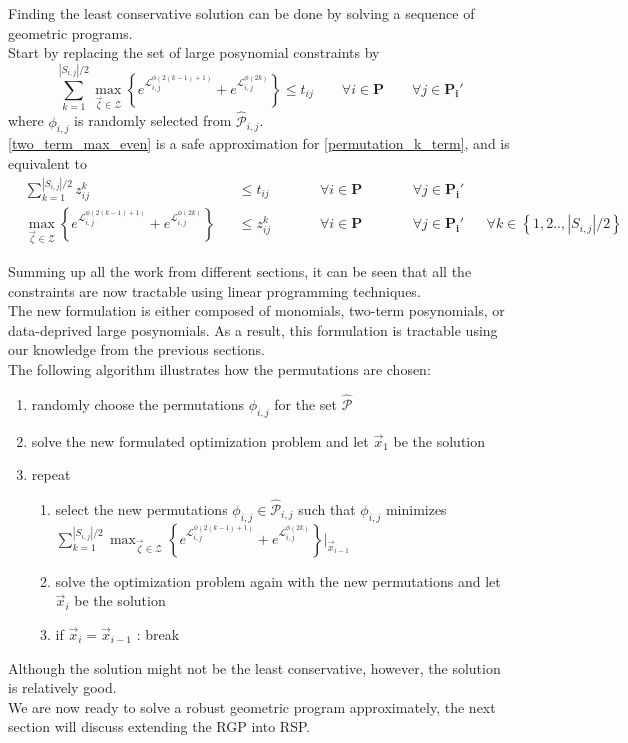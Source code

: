 Finding the least conservative solution can be done by solving a sequence of geometric programs.\\
Start by replacing the set of large posynomial constraints by
\begin{equation}
\textstyle{\sum}_{k=1}^{|S_{i,j}|/2} \max_{\vec{\zeta} \in \mathcal{Z}} \left\{e^{\mathcal{L}^{\phi(2(k-1)+1)}_{i,j}} + e^{\mathcal{L}^{\phi(2k)}_{i,j}}\right\}\leq t_{ij} \qquad \forall i \in \mathbf{P} \qquad \forall j \in \mathbf{P_i'}
\label{two_term_max_even}
\end{equation}
where $\phi_{i,j}$ is randomly selected from $\hat{\mathcal{P}}_{i,j}$.\\
\eqref{two_term_max_even} is a safe approximation for \eqref{permutation_k_term}, and is equivalent to
\begin{equation}
\begin{aligned}
&\textstyle{\sum}_{k=1}^{|S_{i,j}|/2} z_{ij}^k &&\leq t_{ij} \qquad &&\forall i \in \mathbf{P} \qquad &&\forall j \in \mathbf{P_i'}\\
&\max_{\vec{\zeta} \in \mathcal{Z}} \left\{e^{\mathcal{L}^{\phi(2(k-1)+1)}_{i,j}} + e^{\mathcal{L}^{\phi(2k)}_{i,j}}\right\} &&\leq z_{ij}^k &&\forall i \in \mathbf{P} \qquad &&\forall j \in \mathbf{P_i'} &&\forall k \in \left\{1,2..,|S_{i,j}|/2\right\}
\end{aligned}
\label{two_term_even}
\end{equation}

Summing up all the work from different sections, it can be seen that all the constraints are now tractable using linear programming techniques.\\
The new formulation is either composed of monomials, two-term posynomials, or data-deprived large posynomials. As a result, this formulation is tractable using our knowledge from the previous sections.\\[12pt]
The following algorithm illustrates how the permutations are chosen:
\begin{enumerate}
\item randomly choose the permutations $\phi_{i,j}$ for the set $\hat{\mathcal{P}}$
\item solve the new formulated optimization problem and let $\vec{x}_1$ be the solution
\item repeat
\begin{enumerate}
\item select the new permutations $\phi_{i,j} \in \hat{\mathcal{P}}_{i,j}$ such that $\phi_{i,j}$ minimizes $\textstyle{\sum}_{k=1}^{|S_{i,j}|/2} \max_{\vec{\zeta} \in \mathcal{Z}} \left\{e^{\mathcal{L}^{\phi(2(k-1)+1)}_{i,j}} + e^{\mathcal{L}^{\phi(2k)}_{i,j}}\right\}\bigg\rvert_{\vec{x}_{i-1}}$
\item solve the optimization problem again with the new permutations and let $\vec{x}_i$ be the solution
\item if $\vec{x}_i = \vec{x}_{i-1}$ : break
\end{enumerate}
\end{enumerate}
Although the solution might not be the least conservative, however, the solution is relatively good.\\[12pt]
We are now ready to solve a robust geometric program approximately, the next section will discuss extending the RGP into RSP.